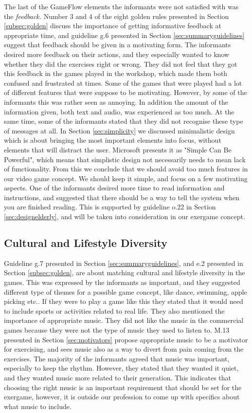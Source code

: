 The last of the GameFlow elements the informants were not satisfied with was the \emph{feedback.} Number 3 and 4 of the eight golden \cite{mmi} rules presented in Section \ref{subsec:golden} discuss the importance of getting informative feedback at appropriate time, and guideline g.6 presented in Section \ref{sec:summaryguidelines} suggest that feedback should be given in a motivating form. The informants desired more feedback on their actions, and they especially wanted to know whether they did the exercises right or wrong. They did not feel that they got this feedback in the games played in the workshop, which made them both confused and frustrated at times. Some of the games that were played had a lot of different features that were suppose to be motivating. However, by some of the informants this was rather seen as annoying.  In addition the amount of the information given, both text and audio, was experienced as too much. At the same time, some of the informants stated that they did not recognise these type of messages at all. In Section \ref{sec:simplicity} we discussed minimalistic design which is about bringing the most important elements into focus, without elements that will distract the user. Microsoft presents it as "Simple Can Be Powerful", which means that simplistic design not necessarily needs to mean lack of functionality. From this we conclude that we should avoid too much features in our video game concept. We should keep it simple, and focus on a few motivating aspects. One of the informants desired more time to read information and instructions, and suggested that there should be a way to tell the system when you are finished reading. This is supported by guideline o.22 in Section \ref{sec:designelderly}, and will be taken into consideration in our exergame concept. 

\subsection{Cultural and Lifestyle Diversity}
Guideline g.7 presented in Section \ref{sec:summaryguidelines}, and e.2 presented in Section \ref{subsec:golden}, are about matching cultural and lifestyle diversity in the games. This was expressed by the informants as important, and they suggested different type of themes for a possible game concept, like dance, swimming, apple picking etc.. If they were to play a game like this they stated that it would need to include sports or activities related to real life. They also mentioned the importance of appropriate music. They did not like the music in the commercial games because they were not the type of music they used to listen to. M.13 presented in Section \ref{sec:motivators} propose appropriate music to be a motivator for exercising, and \cite{schutzer} sees music also as a way to divert from pain coming from the exercises. The majority of the informants agreed that music was important, especially to keep the rhythm. However, they stated that they wanted it quiet, and they wanted music more related to their generation. This indicates that choosing the right music is an important requirement that should be set for the exergame, however, it is outside our profession to come up with specifics about what music to include. 

